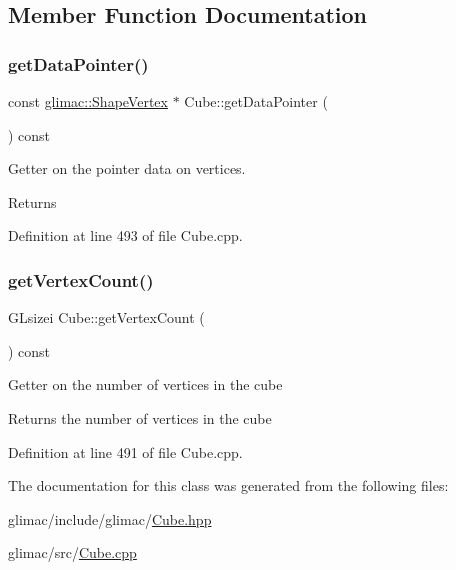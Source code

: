 \subsection{Member Function Documentation}
\mbox{\label{class_cube_a0afd868974cd7d967c8f1998d8fffcd1}} 
\subsubsection{\texorpdfstring{get\+Data\+Pointer()}{getDataPointer()}}
{\footnotesize\ttfamily const \hyperlink{structglimac_1_1_shape_vertex}{glimac\+::\+Shape\+Vertex} $\ast$ Cube\+::get\+Data\+Pointer (\begin{DoxyParamCaption}{ }\end{DoxyParamCaption}) const}

Getter on the pointer data on vertices. \begin{DoxyReturn}{Returns}

\end{DoxyReturn}


Definition at line 493 of file Cube.\+cpp.

\mbox{\label{class_cube_aee60e03ccb085274fb3619713d6999a4}} 
\subsubsection{\texorpdfstring{get\+Vertex\+Count()}{getVertexCount()}}
{\footnotesize\ttfamily G\+Lsizei Cube\+::get\+Vertex\+Count (\begin{DoxyParamCaption}{ }\end{DoxyParamCaption}) const}

Getter on the number of vertices in the cube \begin{DoxyReturn}{Returns}
the number of vertices in the cube 
\end{DoxyReturn}


Definition at line 491 of file Cube.\+cpp.



The documentation for this class was generated from the following files\+:\begin{DoxyCompactItemize}
\item 
glimac/include/glimac/\hyperlink{_cube_8hpp}{Cube.\+hpp}\item 
glimac/src/\hyperlink{_cube_8cpp}{Cube.\+cpp}\end{DoxyCompactItemize}
